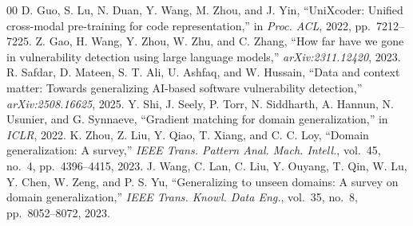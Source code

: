\documentclass[conference]{IEEEtran}
\begin{document}
\begin{thebibliography}{00}
 D. Guo, S. Lu, N. Duan, Y. Wang, M. Zhou, and J. Yin, ``UniXcoder: Unified cross-modal pre-training for code representation,'' in \emph{Proc. ACL}, 2022, pp.~7212--7225.
 Z. Gao, H. Wang, Y. Zhou, W. Zhu, and C. Zhang, ``How far have we gone in vulnerability detection using large language models,'' \emph{arXiv:2311.12420}, 2023.
 R. Safdar, D. Mateen, S. T. Ali, U. Ashfaq, and W. Hussain, ``Data and context matter: Towards generalizing AI-based software vulnerability detection,'' \emph{arXiv:2508.16625}, 2025.
 Y. Shi, J. Seely, P. Torr, N. Siddharth, A. Hannun, N. Usunier, and G. Synnaeve, ``Gradient matching for domain generalization,'' in \emph{ICLR}, 2022.
 K. Zhou, Z. Liu, Y. Qiao, T. Xiang, and C. C. Loy, ``Domain generalization: A survey,'' \emph{IEEE Trans. Pattern Anal. Mach. Intell.}, vol.~45, no.~4, pp.~4396--4415, 2023.
 J. Wang, C. Lan, C. Liu, Y. Ouyang, T. Qin, W. Lu, Y. Chen, W. Zeng, and P. S. Yu, ``Generalizing to unseen domains: A survey on domain generalization,'' \emph{IEEE Trans. Knowl. Data Eng.}, vol.~35, no.~8, pp.~8052--8072, 2023.
\end{thebibliography}
\end{document}
